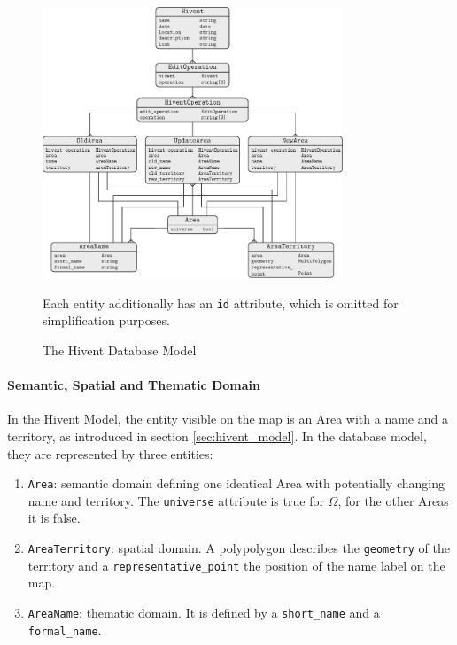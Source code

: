 \begin{figure}[ht]
  \centering
  \includegraphics[width=0.8\textwidth]{graphics/development/application/database_model}
  \caption{The Hivent Database Model}
  \small{Each entity additionally has an \texttt{id} attribute, which is omitted for simplification purposes.}
  \label{fig:database_model_er}
\end{figure}

\paragraph{Semantic, Spatial and Thematic Domain} %
\label{par:semantic_spatial_and_thematic_domain}

In the Hivent Model, the entity visible on the map is an Area with a name and a territory, as introduced in section \ref{sec:hivent_model}. In the database model, they are represented by three entities:

\begin{enumerate}
  \item \texttt{Area}: semantic domain defining one identical Area with potentially changing name and territory. The \texttt{universe} attribute is true for $\Omega$, for the other Areas it is false.
  \item \texttt{AreaTerritory}: spatial domain. A polypolygon describes the \texttt{geometry} of the territory and a \texttt{representative\_point} the position of the name label on the map.
  \item \texttt{AreaName}: thematic domain. It is defined by a \texttt{short\_name} and a \texttt{formal\_name}.
\end{enumerate}

